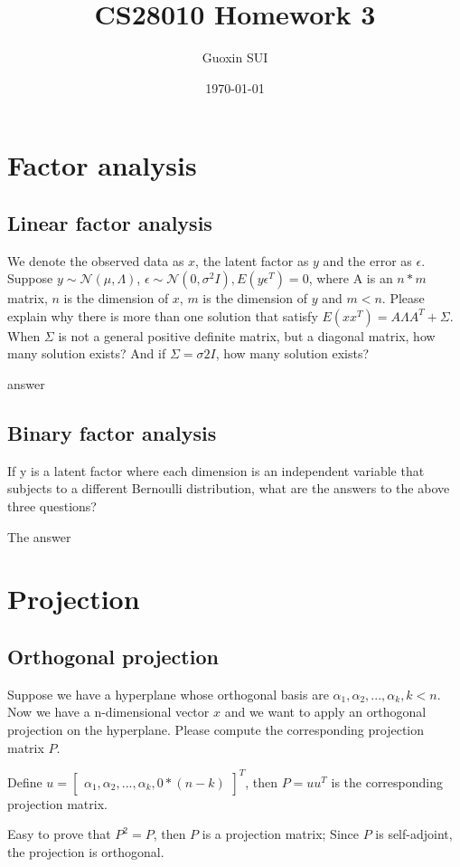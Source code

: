 \documentclass{article}
\title{CS28010 Homework 3}
\author{Guoxin SUI}
\date{\today}
\newenvironment{answer}{\par\color{ForestGreen}}{\par}
\begin{document}
\maketitle

\section{Factor analysis}
\subsection{Linear factor analysis}
We denote the observed data as $x$, the latent factor as $y$ and the error as $\epsilon$. Suppose $y \sim \mathcal{N} (\mu, \Lambda)$, $\epsilon \sim \mathcal{N} (0, \sigma^2I), E(y\epsilon^T ) = 0$,
where A is an $n * m$ matrix, $n$ is the dimension of $x$, $m$ is the dimension of $y$ and $m < n$.
Please explain why there is more than one solution that satisfy $E(xx^T ) = A\Lambda A^T + \Sigma$.
When $\Sigma$ is not a general positive definite matrix, but a diagonal matrix, how many solution exists?
And if $\Sigma = \sigma 2I$, how many solution exists?
\begin{answer}
answer
\end{answer}

\subsection{Binary factor analysis}
If y is a latent factor where each dimension is an independent variable that subjects to a
different Bernoulli distribution, what are the answers to the above three questions?
\begin{answer}
The answer
\end{answer}

\section{Projection}
\subsection{Orthogonal projection}
Suppose we have a hyperplane whose orthogonal basis are $\alpha_1, \alpha_2, ... , \alpha_k, k < n$. Now
we have a n-dimensional vector $x$ and we want to apply an orthogonal projection on the
hyperplane. Please compute the corresponding projection matrix $P$.
\begin{answer}
    Define $u = \begin{bmatrix} \alpha_1, \alpha_2, ... , \alpha_k, 0*(n-k) \end{bmatrix}^T$,
    then $P = uu^T$ is the corresponding projection matrix.

    Easy to prove that $P^2 = P$, then $P$ is a projection matrix; Since $P$ is self-adjoint, the projection is orthogonal.
\end{answer}
\end{document}
